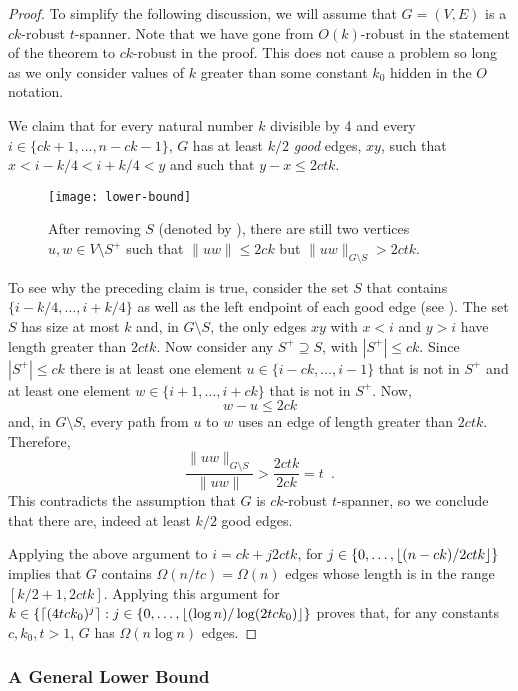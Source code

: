 \documentclass[final]{siamltex}
\begin{document}
\begin{proof}
  To simplify the following discussion, we will assume that $G=(V,E)$ is
  a $ck$-robust $t$-spanner.  Note that we have gone from $O(k)$-robust
  in the statement of the theorem to $ck$-robust in the proof.  This does
  not cause a problem so long as we only consider values of $k$ greater
  than some constant $k_0$ hidden in the $O$ notation.

  We claim that for every natural number $k$ divisible by 4 and every
  $i\in\{ck+1,\ldots,n-ck-1\}$, $G$ has at least $k/2$ \emph{good} edges,
  $xy$, such that $x < i-k/4 < i+k/4 < y$ and such that $y-x \le 2ctk$.

  \begin{figure}
    \begin{center}\texttt{[image: lower-bound]}\end{center}
    \caption{After removing $S$ (denoted by \textbullet), there are
      still two vertices $u,w\in V\setminus S^+$ such that $\|uw\|\le 2ck$
      but $\|uw\|_{G\setminus S} > 2ctk$.}
  \end{figure}
  To see why the preceding claim is true, consider the set $S$ that
  contains $\{i-k/4,\ldots,i+k/4\}$ as well as the left endpoint of each
  good edge (see ).  The set $S$ has size at most
  $k$ and, in $G\setminus S$, the only edges $xy$ with $x<i$ and $y>i$
  have length greater than $2ctk$.  Now consider any $S^+\supseteq S$,
  with $|S^+|\le ck$.  Since $|S^+|\le ck$ there is at least one element
  $u\in\{i-ck,\ldots,i-1\}$ that is not in $S^+$ and at least one element
  $w\in\{i+1,\ldots,i+ck\}$ that is not in $S^+$.  Now,
  \[    w-u \le 2ck \]
  and, in $G\setminus S$, every path from $u$ to $w$ uses an edge of length
  greater than $2ctk$.  Therefore,
  \[
     \frac{\|uw\|_{G\setminus S}}{\|uw\|} > \frac{2ctk}{2ck} = t \enspace .
  \]
  This contradicts the assumption that $G$ is $ck$-robust $t$-spanner, so we
  conclude that there are, indeed at least $k/2$ good edges.
  
  Applying the above argument to $i=ck+j2ctk$, for
  $j\in\{0,\ldots,{\lfloor (n-ck)/2ctk \rfloor}\}$ implies that $G$ contains
  $\Omega(n/tc)=\Omega(n)$ edges whose length is in the range
  $[k/2+1,2ctk]$.  Applying this argument for $k\in\{{\lceil (4tck_0)^{j} \rceil}
  : j\in\{0,\ldots,{\lfloor (\log n)/\log(2tck_0) \rfloor}\}$ proves that, for
  any constants $c,k_0,t>1$, $G$ has $\Omega(n\log n)$ edges.
\end{proof}


\subsubsection{A General Lower Bound}
\end{document}
